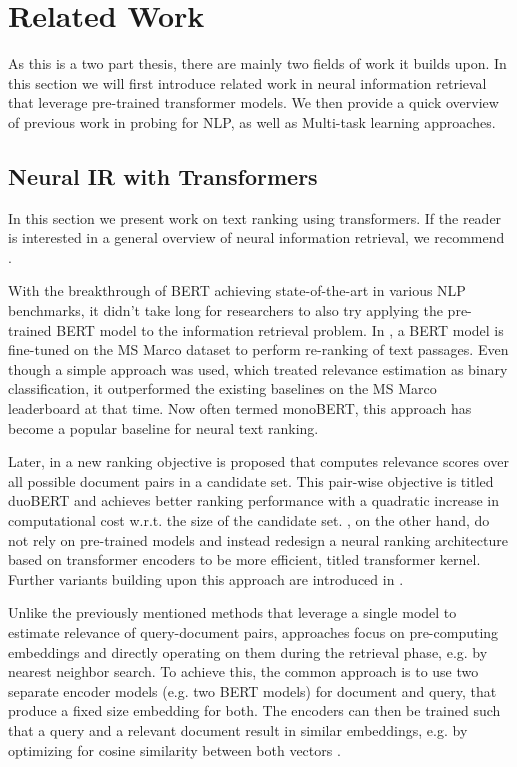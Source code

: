 \chapter{Related Work}
\label{chap:prev}
As this is a two part thesis, there are mainly two fields of work it builds upon. In this section we will first introduce related work in neural information retrieval that leverage pre-trained transformer models. We then provide a quick overview of previous work in probing for NLP, as well as Multi-task learning approaches.

\section{Neural IR with Transformers}
In this section we present work on text ranking using transformers. If the reader is interested in a general overview of neural information retrieval, we recommend \cite{mitra2018an, Onal2017NeuralIR, Guo2020ADL}.

With the breakthrough of BERT \cite{devlin-etal-2019-bert} achieving state-of-the-art in various NLP benchmarks, it didn't take long for researchers to also try applying the pre-trained BERT model to the information retrieval problem. In \cite{Nogueira2019PassageRW}, a BERT model is fine-tuned on the MS Marco dataset \cite{DBLP:journals/corr/NguyenRSGTMD16} to perform re-ranking of text passages. Even though a simple approach was used, which treated relevance estimation as binary classification, it outperformed the existing baselines on the MS Marco leaderboard at that time. Now often termed monoBERT, this approach has become a popular baseline for neural text ranking.

Later, in \cite{Nogueira2019MultiStageDR} a new ranking objective is proposed that computes relevance scores over all possible document pairs in a candidate set. This pair-wise objective is titled duoBERT and achieves better ranking performance with a quadratic increase in computational cost w.r.t. the size of the candidate set. \cite{DBLP:journals/corr/abs-1912-01385}, on the other hand, do not rely on pre-trained models and instead redesign a neural ranking architecture based on transformer encoders to be more efficient, titled transformer kernel. Further variants building upon this approach are introduced in \cite{Hofsttter2020LocalSO, 10.1145/3404835.3463049}.

Unlike the previously mentioned methods that leverage a single model to estimate relevance of query-document pairs,  approaches focus on pre-computing embeddings and directly operating on them during the retrieval phase, e.g. by nearest neighbor search. To achieve this, the common approach is to use two separate encoder models (e.g. two BERT models) for document and query, that produce a fixed size embedding for both. The encoders can then be trained such that a query and a relevant document result in similar embeddings, e.g. by optimizing for cosine similarity between both vectors \cite{Humeau2020Poly-encoders, 10.1145/3397271.3401075, DBLP:journals/corr/abs-1908-10084}.


